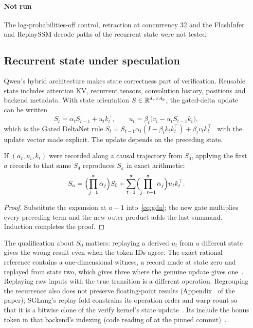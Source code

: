 \paragraph{Not run} The log-probabilities-off control, retraction at concurrency 32 and the FlashInfer and ReplaySSM decode paths of the recurrent state were not tested.

\subsection{Recurrent state under speculation}\label{app:state}\label{sec:exactness-state}
Qwen's hybrid architecture makes state correctness part of verification. Reusable state includes attention KV, recurrent tensors, convolution history, positions and backend metadata. With state orientation $S\in\mathbb R^{d_v\times d_k}$, the gated-delta update can be written
\begin{equation}
S_t=\alpha_tS_{t-1}+u_tk_t^\top,\qquad u_t=\beta_t\bigl(v_t-\alpha_tS_{t-1}k_t\bigr),\label{eq:gdn}
\end{equation}
which is the Gated DeltaNet rule $S_t=S_{t-1}\alpha_t(I-\beta_tk_tk_t^\top)+\beta_tv_tk_t^\top$~\cite{gdn,deltanet} with the update vector made explicit. The update depends on the preceding state.
\begin{proposition}\label{prop:gdn}
If $(\alpha_t,u_t,k_t)$ were recorded along a causal trajectory from $S_0$, applying the first $a$ records to that same $S_0$ reproduces $S_a$ in exact arithmetic:
\[S_a=\Bigl(\prod_{j=1}^{a}\alpha_j\Bigr)S_0+\sum_{t=1}^{a}\Bigl(\prod_{j=t+1}^{a}\alpha_j\Bigr)u_tk_t^\top.\]
\end{proposition}
\begin{proof}
Substitute the expansion at $a-1$ into~\eqref{eq:gdn}; the new gate multiplies every preceding term and the new outer product adds the last summand. Induction completes the proof.
\end{proof}
The qualification about $S_0$ matters: replaying a derived $u_t$ from a different state gives the wrong result even when the token IDs agree. The exact rational reference contains a one-dimensional witness, a record made at state zero and replayed from state two, which gives three where the genuine update gives one~. Replaying raw inputs with the true transition is a different operation. Regrouping the recurrence also does not preserve floating-point results (Appendix~ of the paper); SGLang's replay fold constrains its operation order and warp count so that it is a bitwise clone of the verify kernel's state update~\cite{gdncode}. Its  include the bonus token in that backend's indexing (code reading of  at the pinned commit)~\cite{gdncode}.

